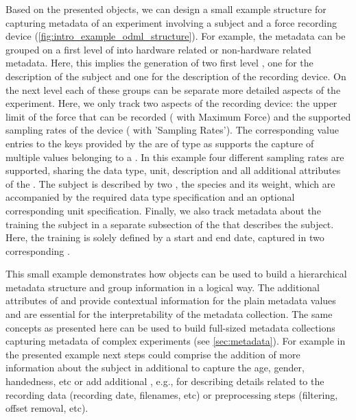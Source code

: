 Based on the presented  objects, we can design a small example structure for capturing metadata of an experiment involving a subject and a force recording device (\cref{fig:intro_example_odml_structure}). For example, the metadata can be grouped on a first level of  into hardware related or non-hardware related metadata. Here, this implies the generation of two first level , one for the description of the subject and one for the description of the recording device. On the next level each of these groups can be separate more detailed aspects of the experiment. Here, we only track two aspects of the recording device: the upper limit of the force that can be recorded ( with  Maximum Force) and the supported sampling rates of the device ( with  'Sampling Rates'). The corresponding value entries to the keys provided by the  are of type  as  supports the capture of multiple values belonging to a . In this example four different sampling rates are supported, sharing the data type, unit, description and all additional attributes of the .
The subject is described by two , the species and its weight, which are accompanied by the required data type specification and an optional corresponding unit specification. Finally, we also track metadata about the training the subject in a separate subsection of the  that describes the subject. Here, the training is solely defined by a start and end date, captured in two corresponding .

This small example demonstrates how  objects can be used to build a hierarchical metadata structure and group information in a logical way. The additional attributes of  and  provide contextual information for the plain metadata values and are essential for the interpretability of the metadata collection. The same concepts  as presented here can be used to build full-sized metadata collections capturing metadata of complex experiments (see \cref{sec:metadata}). For example in the presented example next steps could comprise the addition of more information about the subject in additional  to capture the age, gender, handedness, etc or add additional , e.g., for describing details related to the recording data (recording date, filenames, etc) or preprocessing steps (filtering, offset removal, etc).




